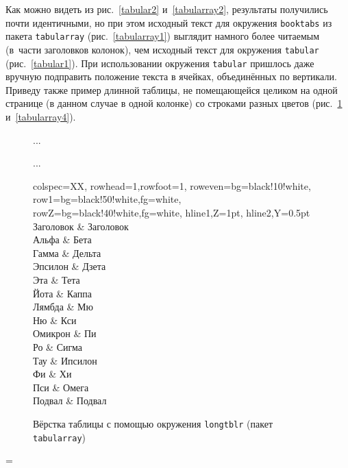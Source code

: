 \documentclass[a4paper,12pt,hyphens]{article}
\newcommand\package[1]{\texttt{#1}}
\begin{document}
Как можно видеть из рис.~\ref{tabular2} и~\ref{tabularray2}, результаты получились почти идентичными, но при этом исходный текст для окружения \package{booktabs} из пакета \package{tabularray} (рис.~\ref{tabularray1}) выглядит намного более читаемым (в~части заголовков колонок), чем исходный текст для окружения \package{tabular} (рис.~\ref{tabular1}). При использовании окружения \package{tabular} пришлось даже вручную подправить положение текста в ячейках, объединённых по вертикали. Приведу также пример длинной таблицы, не помещающейся целиком на одной странице (в данном случае в одной колонке) со строками разных цветов (рис.~\ref{tabularray3} и~\ref{tabularray4}).
\begin{figure}[t]
\begin{latexcode}
...
\usepackage{tabularray}
...
\begin{longtblr}[
  label={table1},
  caption={Пример},
  remark{Примечание}={Таблица разорвана на две колонки.}
]{
  colspec={XX},
  rowhead=1,rowfoot=1,
  row{even}={bg=black!10!white},
  row{1}={bg=black!50!white,fg=white},
  row{Z}={bg=black!40!white,fg=white},
  hline{1,Z}={1pt},
  hline{2,Y}={0.5pt}
}
Заголовок & Заголовок \\
Альфа     & Бета      \\
Гамма     & Дельта    \\
Эпсилон   & Дзета     \\
Эта       & Тета      \\
Йота      & Каппа     \\
Лямбда    & Мю        \\
Ню        & Кси       \\
Омикрон   & Пи        \\
Ро        & Сигма     \\
Тау       & Ипсилон   \\
Фи        & Хи        \\
Пси       & Омега     \\
Подвал    & Подвал    \\
\end{longtblr}
\end{latexcode}
\caption{Вёрстка таблицы с помощью окружения \package{longtblr} (пакет \package{tabularray})}\label{tabularray3}
\end{figure}%
\newdimen\savepagetotal
\newdimen\savepagegoal
\savepagetotal=\pagetotal
\pagetotal=0cm
\end{document}
